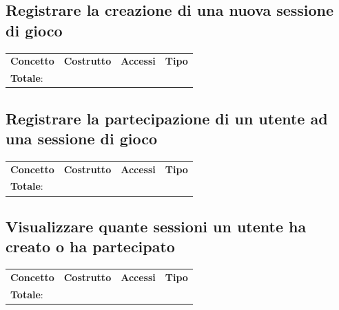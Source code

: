 \documentclass[a4paper,12pt]{report}
\begin{document}
\subsection*{Registrare la creazione di una nuova sessione di gioco}

\begin{table}[h!]
\begin{center}
	\begin{tabular}{ | m{4cm} P{4cm} P{4cm} P{4cm} | }
	\textbf{Concetto} & \textbf{Costrutto} & \textbf{Accessi} & \textbf{Tipo} \\
	\textbf{Totale}: & & & \\
	\hline
	\end{tabular}
\end{center}
\end{table}

\subsection*{Registrare la partecipazione di un utente ad una sessione di gioco}

\begin{table}[h!]
\begin{center}
	\begin{tabular}{ | m{4cm} P{4cm} P{4cm} P{4cm} | }
	\textbf{Concetto} & \textbf{Costrutto} & \textbf{Accessi} & \textbf{Tipo} \\
	\textbf{Totale}: & & & \\
	\hline
	\end{tabular}
\end{center}
\end{table}

\subsection*{Visualizzare quante sessioni un utente ha creato o ha partecipato}

\begin{table}[h!]
\begin{center}
	\begin{tabular}{ | m{4cm} P{4cm} P{4cm} P{4cm} | }
	\textbf{Concetto} & \textbf{Costrutto} & \textbf{Accessi} & \textbf{Tipo} \\
	\textbf{Totale}: & & & \\
	\hline
	\end{tabular}
\end{center}
\end{table}
\end{document}
